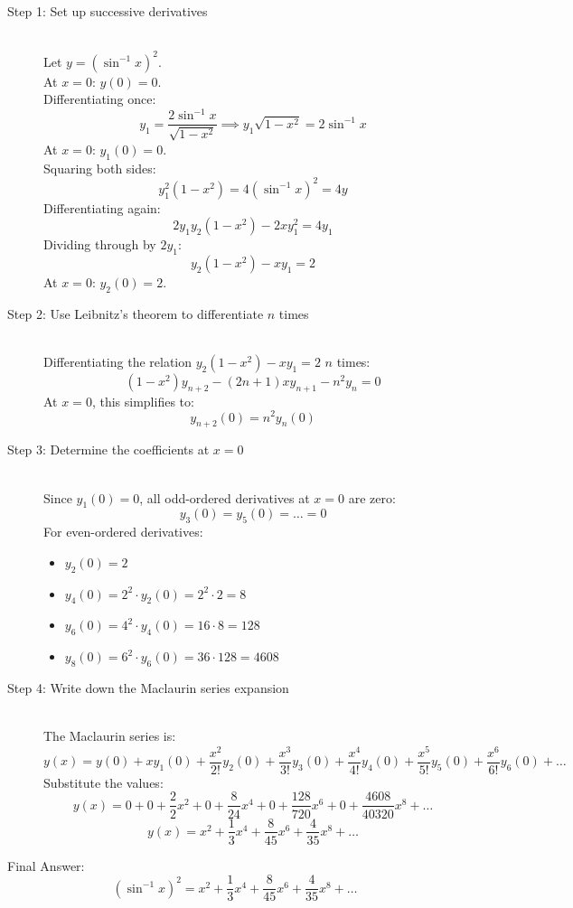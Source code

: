 \documentclass[11pt, a4paper]{article}
\begin{document}
\begin{description}
    \item[Step 1: Set up successive derivatives] \ \\
    Let $y = (\sin^{-1} x)^2$.\\
    At $x = 0$: $y(0) = 0$.\\
    Differentiating once:
    \[ y_1 = \frac{2\sin^{-1}x}{\sqrt{1-x^2}} \implies y_1 \sqrt{1-x^2} = 2\sin^{-1}x \]
    At $x = 0$: $y_1(0) = 0$.\\
    Squaring both sides:
    \[ y_1^2 (1-x^2) = 4(\sin^{-1}x)^2 = 4y \]
    Differentiating again:
    \[ 2y_1 y_2 (1-x^2) - 2x y_1^2 = 4y_1 \]
    Dividing through by $2y_1$:
    \[ y_2(1-x^2) - xy_1 = 2 \]
    At $x = 0$: $y_2(0) = 2$.

    \item[Step 2: Use Leibnitz's theorem to differentiate $n$ times] \ \\
    Differentiating the relation $y_2(1-x^2) - xy_1 = 2$ $n$ times:
    \[ (1-x^2)y_{n+2} - (2n+1)xy_{n+1} - n^2 y_n = 0 \]
    At $x = 0$, this simplifies to:
    \[ y_{n+2}(0) = n^2 y_n(0) \]

    \item[Step 3: Determine the coefficients at $x=0$] \ \\
    Since $y_1(0) = 0$, all odd-ordered derivatives at $x = 0$ are zero:
    \[ y_3(0) = y_5(0) = \dots = 0 \]
    For even-ordered derivatives:
    \begin{itemize}
        \item $y_2(0) = 2$
        \item $y_4(0) = 2^2 \cdot y_2(0) = 2^2 \cdot 2 = 8$
        \item $y_6(0) = 4^2 \cdot y_4(0) = 16 \cdot 8 = 128$
        \item $y_8(0) = 6^2 \cdot y_6(0) = 36 \cdot 128 = 4608$
    \end{itemize}

    \item[Step 4: Write down the Maclaurin series expansion] \ \\
    The Maclaurin series is:
    \[ y(x) = y(0) + x y_1(0) + \frac{x^2}{2!} y_2(0) + \frac{x^3}{3!} y_3(0) + \frac{x^4}{4!} y_4(0) + \frac{x^5}{5!} y_5(0) + \frac{x^6}{6!} y_6(0) + \dots \]
    Substitute the values:
    \[ y(x) = 0 + 0 + \frac{2}{2}x^2 + 0 + \frac{8}{24}x^4 + 0 + \frac{128}{720}x^6 + 0 + \frac{4608}{40320}x^8 + \dots \]
    \[ y(x) = x^2 + \frac{1}{3}x^4 + \frac{8}{45}x^6 + \frac{4}{35}x^8 + \dots \]
\end{description}

Final Answer:
\[ 
\boxed{(\sin^{-1} x)^2 = x^2 + \frac{1}{3}x^4 + \frac{8}{45}x^6 + \frac{4}{35}x^8 + \dots} 
\]

\end{document}
